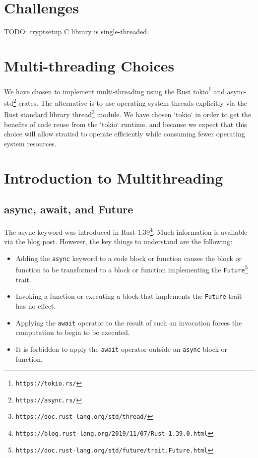 \documentclass[]{article}
\begin{document}
\section{Challenges}
TODO: cryptsetup C library is single-threaded.

\section{Multi-threading Choices}
We have chosen to implement multi-threading using the Rust tokio\footnote{\texttt{https://tokio.rs/}} and async-std\footnote{\texttt{https://async.rs/}} crates. The alternative is to use operating system threads explicitly via the Rust standard library thread\footnote{\texttt{https://doc.rust-lang.org/std/thread/}} module. We have chosen `tokio` in order to get the benefits of code reuse from the `tokio` runtime, and because we expect that this choice will allow stratisd to operate efficiently while consuming fewer operating system resources.

\section{Introduction to Multithreading}
\subsection{async, await, and Future}

The async keyword was introduced in Rust 1.39\footnote{\texttt{https://blog.rust-lang.org/2019/11/07/Rust-1.39.0.html}}. Much information is available via the blog post. However, the key things to understand are the following:

\begin{itemize}
\item Adding the \texttt{async} keyword to a code block or function causes the block or function to be transformed to a block or function implementing the \texttt{Future}\footnote{\texttt{https://doc.rust-lang.org/std/future/trait.Future.html}} trait.

\item Invoking a function or executing a block that implements the \texttt{Future} trait has no effect.

\item Applying the \texttt{await} operator to the result of such an invocation forces the computation to begin to be executed.

\item It is forbidden to apply the \texttt{await} operator outside an \texttt{async} block or function.
\end{itemize}
\end{document}
